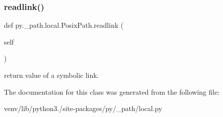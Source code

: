 \subsubsection{\texorpdfstring{readlink()}{readlink()}}
{\footnotesize\ttfamily def py.\+\_\+path.\+local.\+Posix\+Path.\+readlink (\begin{DoxyParamCaption}\item[{}]{self }\end{DoxyParamCaption})}

\begin{DoxyVerb}return value of a symbolic link. \end{DoxyVerb}
 

The documentation for this class was generated from the following file\+:\begin{DoxyCompactItemize}
\item 
venv/lib/python3./site-\/packages/py/\+\_\+path/local.\+py\end{DoxyCompactItemize}
